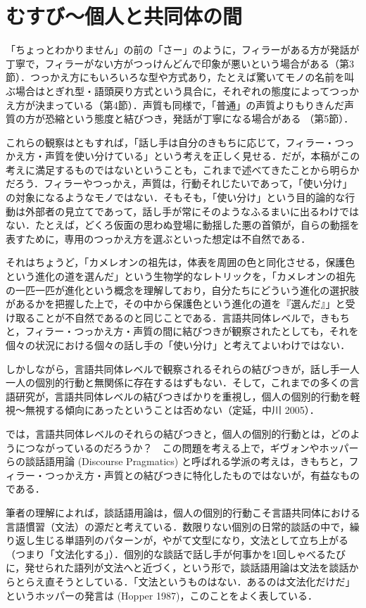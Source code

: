\documentclass[japanese]{jnlp_1.3b}
\begin{document}
\section{むすび〜個人と共同体の間}

「ちょっとわかりません」の前の「さー」のように，フィラーがある方が発話が丁寧で，フィラーがない方がつっけんどんで印象が悪いという場合がある（第3節）．つっかえ方にもいろいろな型や方式あり，たとえば驚いてモノの名前を叫ぶ場合はとぎれ型・語頭戻り方式という具合に，それぞれの態度によってつっかえ方が決まっている（第4節）．声質も同様で，「普通」の声質よりもりきんだ声質の方が恐縮という態度と結びつき，発話が丁寧になる場合がある\linebreak
（第5節）．

これらの観察はともすれば，「話し手は自分のきもちに応じて，フィラー・つっかえ方・声質を使い分けている」という考えを正しく見せる．だが，本稿がこの考えに満足するものではないということも，これまで述べてきたことから明らかだろう．フィラーやつっかえ，声質は，行動それじたいであって，「使い分け」の対象になるようなモノではない．そもそも，「使い分け」という目的論的な行動は外部者の見立てであって，話し手が常にそのようなふるまいに出るわけではない．たとえば，どくろ仮面の思わぬ登場に動揺した悪の首領が，自らの動揺を表すために，専用のつっかえ方を選ぶといった想定は不自然である．

それはちょうど，「カメレオンの祖先は，体表を周囲の色と同化させる，保護色という進化の道を選んだ」という生物学的なレトリックを，「カメレオンの祖先の一匹一匹が進化という概念を理解しており，自分たちにどういう進化の選択肢があるかを把握した上で，その中から保護色という進化の道を『選んだ』」と受け取ることが不自然であるのと同じことである．言語共同体レベルで，きもちと，フィラー・つっかえ方・声質の間に結びつきが観察されたとしても，それを個々の状況における個々の話し手の「使い分け」と考えてよいわけではない．

しかしながら，言語共同体レベルで観察されるそれらの結びつきが，話し手一人一人の個別的行動と無関係に存在するはずもない．そして，これまでの多くの言語研究が，言語共同体レベルの結びつきばかりを重視し，個人の個別的行動を軽視〜無視する傾向にあったということは否めない（定延，中川 2005）．

では，言語共同体レベルのそれらの結びつきと，個人の個別的行動とは，どのようにつながっているのだろうか？　この問題を考える上で，ギヴォンやホッパーらの談話語用論 (Discourse Pragmatics) と呼ばれる学派の考えは，きもちと，フィラー・つっかえ方・声質との結びつきに特化したものではないが，有益なものである．

筆者の理解によれば，談話語用論は，個人の個別的行動こそ言語共同体における言語慣習（文法）の源だと考えている．数限りない個別の日常的談話の中で，繰り返し生じる単語列のパターンが，やがて文型になり，文法として立ち上がる（つまり「文法化する」）．個別的な談話で話し手が何事かを1回しゃべるたびに，発せられた語列が文法へと近づく，という形で，談話語用論は文法を談話からとらえ直そうとしている．「文法というものはない．あるのは文法化だけだ」というホッパーの発言は (Hopper 1987)，このことをよく表している．
\end{document}
